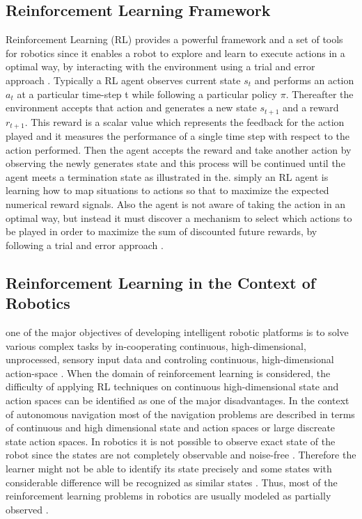 \documentclass[a4paper,oneside,12pt]{report}
\begin{document}
\subsection{Reinforcement Learning Framework}
Reinforcement Learning (RL) provides a powerful framework and a set of tools for robotics since it enables a robot to explore and learn to execute actions in a optimal way,  by interacting with the environment using a trial and error approach \cite{R03}. Typically a RL agent observes current state $s_t$ and performs an action $a_t$ at a particular time-step t while following a particular policy $\pi$. Thereafter the environment accepts that action and generates a new state $s_{t+1}$ and a  reward $r_{t+1}$. This reward is a scalar value which represents the feedback for the action played and it measures the performance of a single time step with respect to the action performed. Then the agent accepts the reward and take another action by observing the newly generates state and this process will be continued until the agent meets a termination state as illustrated in the. simply an RL agent is learning how to map situations to actions so that to maximize the expected numerical reward signals. Also the agent is not aware of taking the action in an optimal way, but instead it must discover a mechanism to select which actions to be played in order to maximize the sum of discounted future rewards, by following a trial and error approach \cite{R37}.

\subsection{Reinforcement Learning in the Context of Robotics}

one of the major objectives of developing intelligent robotic platforms is to solve various complex tasks by in-cooperating continuous, high-dimensional, unprocessed, sensory input data and controling continuous, high-dimensional action-space \cite{R06}. When the domain of reinforcement learning is considered, the difficulty of applying RL techniques on continuous high-dimensional state and action spaces can be identified as one of the major disadvantages. In the context of autonomous navigation most of the navigation problems are described in terms of continuous and high dimensional state and action spaces or large discreate state action spaces. In robotics it is not possible to observe exact state of the robot since the states are not completely observable and noise-free \cite{R03}. Therefore the learner might not be able to identify its state precisely and some states with considerable difference will be recognized as similar states \cite{R03}. Thus, most of the reinforcement learning problems in robotics are usually modeled as partially observed \cite{R03}.
\end{document}
